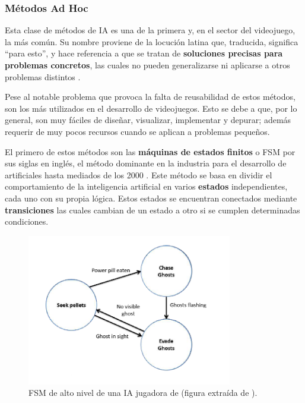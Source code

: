 \subsubsection{Métodos Ad Hoc}
Esta clase de métodos de IA es una de la primera y, en el sector del videojuego, la más común. Su nombre proviene de la locución latina que, traducida, significa ``para esto'', y hace referencia a que se tratan de \textbf{soluciones precisas para problemas concretos}, las cuales no pueden generalizarse ni aplicarse a otros problemas distintos \cite{ai_and_games}.

Pese al notable problema que provoca la falta de reusabilidad de estos métodos, son los más utilizados en el desarrollo de videojuegos. Esto se debe a que, por lo general, son muy fáciles de diseñar, visualizar, implementar y depurar; además requerir de muy pocos recursos cuando se aplican a problemas pequeños.

El primero de estos métodos son las \textbf{máquinas de estados finitos} o FSM por sus siglas en inglés, el método dominante en la industria para el desarrollo de  artificiales hasta mediados de los 2000 \cite{ai_and_games}. Este método se basa en dividir el comportamiento de la inteligencia artificial en varios \textbf{estados} independientes, cada uno con su propia lógica. Estos estados se encuentran conectados mediante \textbf{transiciones} las cuales cambian de un estado a otro si se cumplen determinadas condiciones.

\begin{figure}[h]
	\includegraphics[width=0.8\textwidth]{images/estadodelarte/ai/pacman-fsm}
	\centering
	\caption{FSM de alto nivel de una IA jugadora de  (figura extraída de \cite{ai_and_games}).}
	\label{pacman}
\end{figure}

